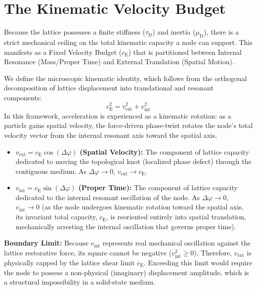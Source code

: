 \section{The Kinematic Velocity Budget}
\label{sec:velocity_budget}
Because the lattice possesses a finite stiffness ($\tau_{\mathrm{D}}$) and inertia ($\mu_{\mathrm{D}}$), there is a strict mechanical ceiling on the total kinematic capacity a node can support. This manifests as a Fixed Velocity Budget ($c_{\mathrm{E}}$) that is partitioned between Internal Resonance (Mass/Proper Time) and External Translation (Spatial Motion).

We define the microscopic kinematic identity, which follows from the orthogonal decomposition of lattice displacement into translational and resonant components:
\begin{equation}
    c_{\mathrm{E}}^2 = v_{\mathrm{ext}}^2 + v_{\mathrm{int}}^2
\end{equation}
In this framework, acceleration is experienced as a kinematic rotation: as a particle gains spatial velocity, the force-driven phase-twist rotates the node's total velocity vector from the internal resonant axis toward the spatial axis.
\begin{itemize}
    \item $v_{\mathrm{ext}} = c_{\mathrm{E}} \cos(\Delta\varphi)$ \textbf{(Spatial Velocity):} The component of lattice capacity dedicated to moving the topological knot (localized phase defect) through the contiguous medium. As $\Delta\varphi \to 0$, $v_{\mathrm{ext}} \to c_{\mathrm{E}}$.
    \item $v_{\mathrm{int}} = c_{\mathrm{E}} \sin(\Delta\varphi)$ \textbf{(Proper Time):} The component of lattice capacity dedicated to the internal resonant oscillation of the node. As $\Delta\varphi \to 0$, $v_{\mathrm{int}} \to 0$ (as the node undergoes kinematic rotation toward the spatial axis, its invariant total capacity, $c_{\mathrm{E}}$, is reoriented entirely into spatial translation, mechanically arresting the internal oscillation that governs proper time).
\end{itemize}

\noindent\textbf{Boundary Limit:} Because $v_{\mathrm{int}}$ represents real mechanical oscillation against the lattice restorative force, its square cannot be negative ($v_{\mathrm{int}}^2 \ge 0$). Therefore, $v_{\mathrm{ext}}$ is physically capped by the lattice shear limit $c_{\mathrm{E}}$. Exceeding this limit would require the node to possess a non-physical (imaginary) displacement amplitude, which is a structural impossibility in a solid-state medium.

